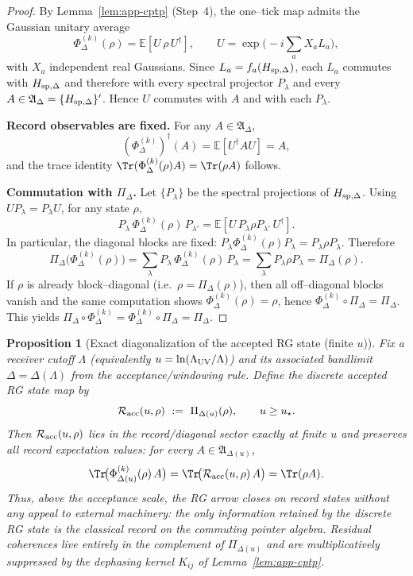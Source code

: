\documentclass[10pt]{article}
\theoremstyle{definition}
\theoremstyle{plain}
\newtheorem{proposition}{Proposition}[section]
\begin{document}
\begin{proof}
By Lemma~\ref{lem:app-cptp} (Step~4), the one--tick map admits the Gaussian unitary average
\[
\Phi_\Delta^{(k)}(\rho)=\mathbb E\!\left[U\,\rho\,U^\dagger\right],
\qquad
U=\exp\!\Big(-i\sum_a X_a L_a\Big),
\]
with $X_a$ independent real Gaussians. Since $L_a=f_a(H_{{\rm sp},\Delta})$, each $L_a$ commutes with
$H_{{\rm sp},\Delta}$ and therefore with every spectral projector $P_\lambda$ and every
$A\in\mathfrak A_\Delta=\{H_{{\rm sp},\Delta}\}'$. Hence $U$ commutes with $A$ and with each $P_\lambda$.

\medskip
\noindent\textbf{Record observables are fixed.}
For any $A\in\mathfrak A_\Delta$,
\[
(\Phi_\Delta^{(k)})^\dagger(A)
=\mathbb E\!\left[U^\dagger A U\right]
=A,
\]
and the trace identity $\Tr(\Phi_\Delta^{(k)}(\rho)A)=\Tr(\rho A)$ follows.

\medskip
\noindent\textbf{Commutation with $\Pi_\Delta$.}
Let $\{P_\lambda\}$ be the spectral projections of $H_{{\rm sp},\Delta}$. Using $U P_\lambda=P_\lambda U$,
for any state $\rho$,
\[
P_\lambda\,\Phi_\Delta^{(k)}(\rho)\,P_{\lambda'}
=\mathbb E\!\left[U\,P_\lambda\rho P_{\lambda'}\,U^\dagger\right].
\]
In particular, the diagonal blocks are fixed:
$P_\lambda\Phi_\Delta^{(k)}(\rho)P_\lambda=P_\lambda\rho P_\lambda$.
Therefore
\[
\Pi_\Delta\!\big(\Phi_\Delta^{(k)}(\rho)\big)
=\sum_\lambda P_\lambda\,\Phi_\Delta^{(k)}(\rho)\,P_\lambda
=\sum_\lambda P_\lambda\rho P_\lambda
=\Pi_\Delta(\rho).
\]
If $\rho$ is already block--diagonal (i.e.\ $\rho=\Pi_\Delta(\rho)$), then all off--diagonal blocks vanish and
the same computation shows $\Phi_\Delta^{(k)}(\rho)=\rho$, hence
$\Phi_\Delta^{(k)}\!\circ\Pi_\Delta=\Pi_\Delta$. This yields
$\Pi_\Delta\circ\Phi_\Delta^{(k)}=\Phi_\Delta^{(k)}\circ\Pi_\Delta=\Pi_\Delta$.
\end{proof}

\begin{proposition}[Exact diagonalization of the accepted RG state (finite $u$)]
\label{prop:semiclassical-diag}
Fix a receiver cutoff $\Lambda$ (equivalently $u=\ln(\Lambda_{\rm UV}/\Lambda)$) and its associated bandlimit
$\Delta=\Delta(\Lambda)$ from the acceptance/windowing rule. Define the discrete \emph{accepted RG state} map by
\begin{equation}
\mathcal R_{\rm acc}(u,\rho)\ :=\ \Pi_{\Delta(u)}(\rho),
\qquad u\ge u_\star.
\label{eq:R-acc}
\end{equation}
Then $\mathcal R_{\rm acc}(u,\rho)$ lies in the record/diagonal sector \emph{exactly} at finite $u$ and
preserves all record expectation values: for every $A\in\mathfrak A_{\Delta(u)}$,
\[
\Tr\!\big(\Phi_{\Delta(u)}^{(k)}(\rho)\,A\big)=\Tr\!\big(\mathcal R_{\rm acc}(u,\rho)\,A\big)=\Tr(\rho A).
\]
Thus, above the acceptance scale, the RG arrow closes on record states without any appeal to external machinery:
the only information retained by the discrete RG state is the classical record on the commuting pointer algebra.
Residual coherences live entirely in the complement of $\Pi_{\Delta(u)}$ and are multiplicatively suppressed by the
dephasing kernel $K_{ij}$ of Lemma~\ref{lem:app-cptp}.
\end{proposition}
\end{document}
